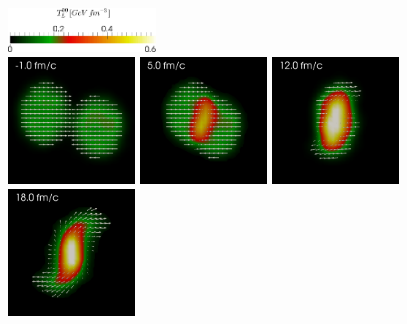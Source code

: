\begin{figure}
  \centering
  \includegraphics[width=0.35\textwidth]{plots/smash/thermodynamics/AuAu_EKin08GeV_b3_Ntest20/scale_T00.png}  \\
  \vspace{0.1cm}
  \includegraphics[width=0.3\textwidth]{plots/smash/thermodynamics/AuAu_EKin08GeV_b3_Ntest20/AuAu_EKin08_b3_1.png}
  \includegraphics[width=0.3\textwidth]{plots/smash/thermodynamics/AuAu_EKin08GeV_b3_Ntest20/AuAu_EKin08_b3_2.png}
  \includegraphics[width=0.3\textwidth]{plots/smash/thermodynamics/AuAu_EKin08GeV_b3_Ntest20/AuAu_EKin08_b3_3.png} \\
  \vspace{0.1cm}
  \includegraphics[width=0.3\textwidth]{plots/smash/thermodynamics/AuAu_EKin08GeV_b3_Ntest20/AuAu_EKin08_b3_4.png}

\end{figure}
